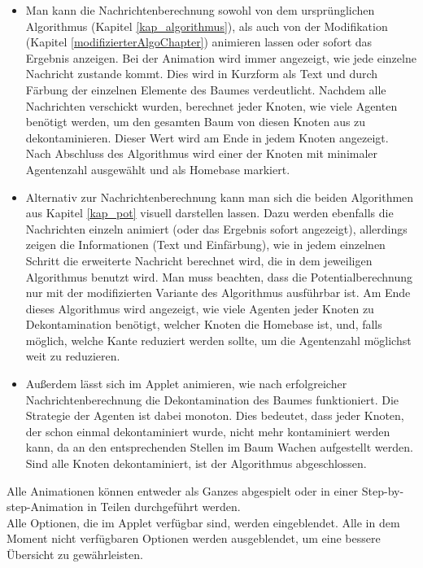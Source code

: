 \begin{itemize}
	\item Man kann die Nachrichtenberechnung sowohl von dem ursprünglichen Algorithmus (Kapitel \ref{kap_algorithmus}), als auch von der Modifikation (Kapitel \ref{modifizierterAlgoChapter}) animieren lassen oder sofort das Ergebnis anzeigen. Bei der Animation wird immer angezeigt, wie jede einzelne Nachricht zustande kommt. Dies wird in Kurzform als Text und durch Färbung der einzelnen Elemente des Baumes verdeutlicht. Nachdem alle Nachrichten verschickt wurden, berechnet jeder Knoten, wie viele Agenten benötigt werden, um den gesamten Baum von diesen Knoten aus zu dekontaminieren. Dieser Wert wird am Ende in jedem Knoten angezeigt. Nach Abschluss des Algorithmus wird einer der Knoten mit minimaler Agentenzahl ausgewählt und als Homebase markiert.
	
	\item Alternativ zur Nachrichtenberechnung kann man sich die beiden Algorithmen aus Kapitel \ref{kap_pot} visuell darstellen lassen. Dazu werden ebenfalls die Nachrichten einzeln animiert (oder das Ergebnis sofort angezeigt), allerdings zeigen die Informationen (Text und Einfärbung), wie in jedem einzelnen Schritt die erweiterte Nachricht berechnet wird, die in dem jeweiligen Algorithmus benutzt wird. Man muss beachten, dass die Potentialberechnung nur mit der modifizierten Variante des Algorithmus ausführbar ist. Am Ende dieses Algorithmus wird angezeigt, wie viele Agenten jeder Knoten zu Dekontamination benötigt, welcher Knoten die Homebase ist, und, falls möglich, welche Kante reduziert werden sollte, um die Agentenzahl möglichst weit zu reduzieren.
	
	\item Außerdem lässt sich im Applet animieren, wie nach erfolgreicher Nachrichtenberechnung die Dekontamination des Baumes funktioniert. Die Strategie der Agenten ist dabei monoton. Dies bedeutet, dass jeder Knoten, der schon einmal dekontaminiert wurde, nicht mehr kontaminiert werden kann, da an den entsprechenden Stellen im Baum Wachen aufgestellt werden. Sind alle Knoten dekontaminiert, ist der Algorithmus abgeschlossen.
\end{itemize}

Alle Animationen können entweder als Ganzes abgespielt oder in einer Step-by-step-Animation in Teilen durchgeführt werden. \\
Alle Optionen, die im Applet verfügbar sind, werden eingeblendet. Alle in dem Moment nicht verfügbaren Optionen werden ausgeblendet, um eine bessere Übersicht zu gewährleisten.

